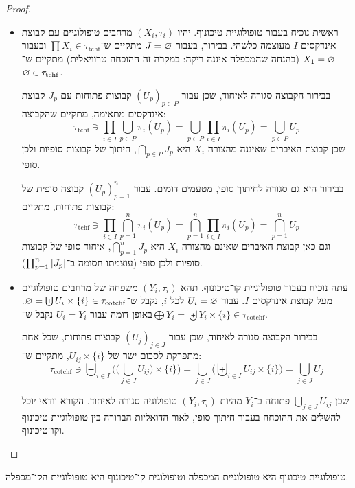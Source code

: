 \documentclass[name=רשימות טופולוגיה כללית]{../../../tex/classes/noChapterMegasumPreamble}
\newcommand\tych{\tau_{\mathrm{tchf}}}
\newcommand\cotych{\tau_{\mathrm{cotchf}}}
\begin{document}
	\begin{proof}
		\begin{itemize}
			\item ראשית נוכיח בעבור טופולוגיית טיכונוף. יהיו $(X_i, \tau_i)$ מרחבים טופולוגיים עם קבוצת אינדקסים $I$ מעוצמה כלשהי. בבירור, בעבור $J = \varnothing$ מתקיים ש־$\prod X_i \in \tych$ ובעבור $X_1 = \varnothing$ (בהנחה שהמכפלה איננה ריקה: במקרה זה ההוכחה טרוויאלית) מתקיים ש־$\vn \in \tych$.
			
			בבירור הקבוצה סגורה לאיחוד, שכן עבור $(U_p)_{p \in P}$ קבוצות פתוחות עם $J_p$ קבוצת אינדקסים מתאימה, מתקיים שהקבוצה: 
			\[ \tych \ni \prod_{i \in I} \bigcup_{p \in P} \pi_i(U_p) = \bigcup_{p \in P} \prod_{i \in I} \pi_i(U_p) = \bigcup_{p \in P}U_p \]
			שכן קבוצת האיברים שאיננה מהצורה $X_i$ היא $\bigcap_{p \in P} J_p$, חיתוך של קבוצות סופיות ולכן סופי. 
			
			בבירור היא גם סגורה לחיתוך סופי, מטעמים דומים. עבור $(U_p)_{p = 1}^{n}$ קבוצה סופית של קבוצות פתוחות, מתקיים: 
			\[ \tych \ni \prod_{i \in I} \bigcap_{p = 1}^{n} \pi_i(U_p) = \bigcap_{p = 1}^{n} \prod_{i \in I} \pi_i(U_p) = \bigcap_{p = 1}^{n}U_p \]
			וגם כאן קבוצת האיברים שאינם מהצורה $X_i$ היא $\bigcap_{p = 1}^{n} J_p$, איחוד סופי של קבוצות סופיות ולכן סופי (עוצמתו חסומה ב־$\prod_{p = 1}^{n} \left \lvert J_p \right \rvert$). 
			\item עתה נוכיח בעבור טופולוגיית קו־טיכונוף. תהא $(Y_i, \tau_i)$ משפחה של מרחבים טופולוגיים מעל קבוצת אינדקסים $I$. עבור $U_i = \varnothing$ לכל $i$, נקבל ש־$\vn = \biguplus U_i \times \{i\} \in \cotych$. באופן דומה עבור $U_i = Y_i$ נקבל ש־$\bigoplus Y_i = \biguplus Y_i \times \{i\} \in \cotych$. 
			
			בבירור הקבוצה סגורה לאיחוד, שכן עבור $(U_j)_{j \in J}$ קבוצות פתוחות, שכל אחת מתפרקת לסכום ישר של $U_{ij} \times \{i\}$, מתקיים ש־: 
			\[ \cotych \ni \biguplus_{i \in I}\Bigg(\bigg(\bigcup_{j \in J}U_{ij}\bigg) \times \{i\}\Bigg) = 
			\bigcup_{j \in J}\Bigg(\biguplus_{i \in I}U_{ij}\times \{i\} \Bigg) = \bigcup_{j \in J}U_j \]
			
			שכן $\bigcup_{j \in J}U_{ij}$ פתוחה ב־$Y_i$ מהיות $(Y_i, \tau_i)$ טופולוגיה סגורה לאיחוד. 
			הקורא וודאי יוכל להשלים את ההוכחה בעבור חיתוך סופי, לאור הדואליות הברורה בין טופולוגיית טיכונוף וקו־טיכונוף. 
		\end{itemize}\envendproof
	\end{proof}
	\begin{Theorem}\label{theo:tych-prod}
		טופולוגיית טיכונוף היא טופולוגיית המכפלה וטופולוגית קו־טיכונוף היא טופולוגיית הקו־מכפלה. 
	\end{Theorem}
\end{document}
